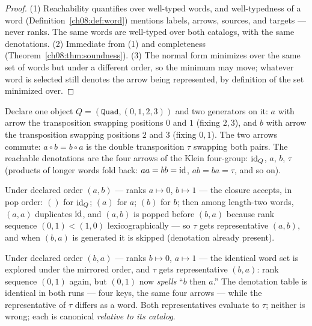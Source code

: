 \begin{proof}
(1) Reachability quantifies over well-typed words, and well-typedness of a
word (Definition~\ref{ch08:def:word}) mentions labels, arrows, sources, and
targets --- never ranks. The same words are well-typed over both catalogs,
with the same denotations. (2) Immediate from (1) and completeness
(Theorem~\ref{ch08:thm:soundness}). (3) The normal form minimizes over the
same set of words but under a different order, so the minimum may move;
whatever word is selected still denotes the arrow being represented, by
definition of the set minimized over.
\end{proof}

\begin{example}\label{ch08:ex:orderrel}
Declare one object $Q=(\texttt{Quad},(0,1,2,3))$ and two generators on it:
$a$ with arrow the transposition swapping positions $0$ and $1$ (fixing
$2,3$), and $b$ with arrow the transposition swapping positions $2$ and $3$
(fixing $0,1$). The two arrows commute: $a\circ b=b\circ a$ is the double
transposition $\tau$ swapping both pairs. The reachable denotations are the
four arrows of the Klein four-group: $\mathrm{id}_Q$, $a$, $b$, $\tau$ (products of
longer words fold back: $aa=bb=\mathrm{id}$, $ab=ba=\tau$, and so on).

Under declared order $(a,b)$ --- ranks $a\mapsto 0$, $b\mapsto 1$ --- the
closure accepts, in pop order: $()$ for $\mathrm{id}_Q$; $(a)$ for $a$; $(b)$ for
$b$; then among length-two words, $(a,a)$ duplicates $\mathrm{id}$, and
$(a,b)$ is popped before $(b,a)$ because rank sequence $(0,1)<(1,0)$
lexicographically --- so $\tau$ gets representative $(a,b)$, and when
$(b,a)$ is generated it is skipped (denotation already present).

Under declared order $(b,a)$ --- ranks $b\mapsto 0$, $a\mapsto 1$ --- the
identical word set is explored under the mirrored order, and $\tau$ gets
representative $(b,a)$: rank sequence $(0,1)$ again, but $(0,1)$ now
\emph{spells} ``$b$ then $a$.'' The denotation table is identical in both
runs --- four keys, the same four arrows --- while the representative of
$\tau$ differs as a word. Both representatives evaluate to $\tau$; neither
is wrong; each is canonical \emph{relative to its catalog}.
\end{example}

